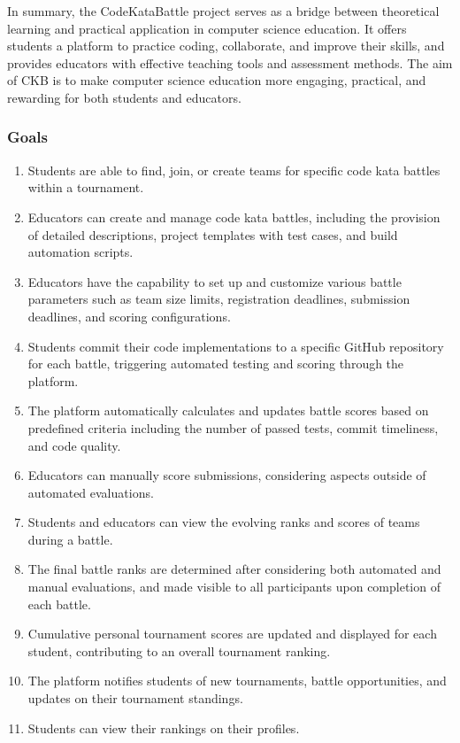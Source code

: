In summary, the CodeKataBattle project serves as a bridge between theoretical learning and practical application in computer science education. It offers students a platform to practice coding, collaborate, and improve their skills, and provides educators with effective teaching tools and assessment methods. The aim of CKB is to make computer science education more engaging, practical, and rewarding for both students and educators.

\subsubsection{Goals}

\begin{enumerate}

\item Students are able to find, join, or create teams for specific code kata battles within a tournament.

\item  Educators can create and manage code kata battles, including the provision of detailed descriptions, project templates with test cases, and build automation scripts.

\item  Educators have the capability to set up and customize various battle parameters such as team size limits, registration deadlines, submission deadlines, and scoring configurations.

\item  Students commit their code implementations to a specific GitHub repository for each battle, triggering automated testing and scoring through the platform.

\item  The platform automatically calculates and updates battle scores based on predefined criteria including the number of passed tests, commit timeliness, and code quality.

\item  Educators can manually score submissions, considering aspects outside of automated evaluations.

\item  Students and educators can view the evolving ranks and scores of teams during a battle.

\item  The final battle ranks are determined after considering both automated and manual evaluations, and made visible to all participants upon completion of each battle.

\item  Cumulative personal tournament scores are updated and displayed for each student, contributing to an overall tournament ranking.

\item  The platform notifies students of new tournaments, battle opportunities, and updates on their tournament standings.

\item  Students can view their rankings on their profiles.
\end{enumerate}

